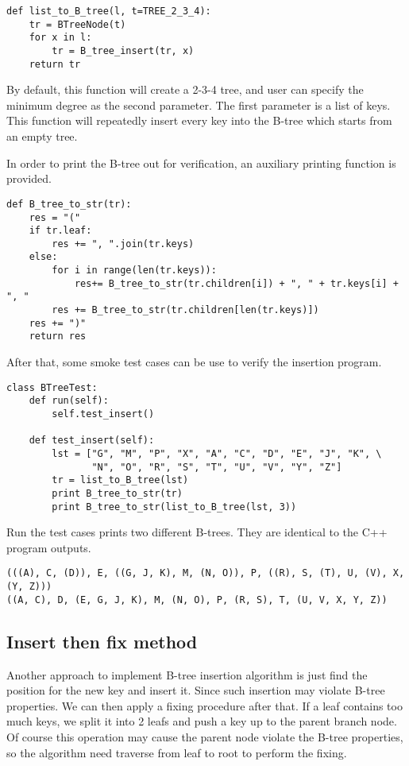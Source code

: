 \documentclass{article}
\begin{document}
\begin{lstlisting}
def list_to_B_tree(l, t=TREE_2_3_4):
    tr = BTreeNode(t)
    for x in l:
        tr = B_tree_insert(tr, x)
    return tr
\end{lstlisting}

By default, this function will create a 2-3-4 tree, and user can specify the
minimum degree as the second parameter. The first parameter is a list of keys.
This function will repeatedly insert every key into the B-tree which starts
from an empty tree.

In order to print the B-tree out for verification, an auxiliary printing
function is provided.

\begin{lstlisting}
def B_tree_to_str(tr):
    res = "("
    if tr.leaf:
        res += ", ".join(tr.keys)
    else:
        for i in range(len(tr.keys)):
            res+= B_tree_to_str(tr.children[i]) + ", " + tr.keys[i] + ", "
        res += B_tree_to_str(tr.children[len(tr.keys)])
    res += ")"
    return res
\end{lstlisting}

After that, some smoke test cases can be use to verify the insertion
program.

\begin{lstlisting}
class BTreeTest:
    def run(self):
        self.test_insert()

    def test_insert(self):
        lst = ["G", "M", "P", "X", "A", "C", "D", "E", "J", "K", \
               "N", "O", "R", "S", "T", "U", "V", "Y", "Z"]
        tr = list_to_B_tree(lst)
        print B_tree_to_str(tr)
        print B_tree_to_str(list_to_B_tree(lst, 3))
\end{lstlisting}

Run the test cases prints two different B-trees. They are identical
to the C++ program outputs.

\begin{verbatim}
(((A), C, (D)), E, ((G, J, K), M, (N, O)), P, ((R), S, (T), U, (V), X, (Y, Z)))
((A, C), D, (E, G, J, K), M, (N, O), P, (R, S), T, (U, V, X, Y, Z))
\end{verbatim}

\subsection{Insert then fix method}
Another approach to implement B-tree insertion algorithm is just find
the position for the new key and insert it. Since such insertion may
violate B-tree properties. We can then apply a fixing procedure after
that. If a leaf contains too much keys, we split it into 2 leafs and
push a key up to the parent branch node. Of course this operation
may cause the parent node violate the B-tree properties, so the
algorithm need traverse from leaf to root to perform the fixing.
\end{document}
